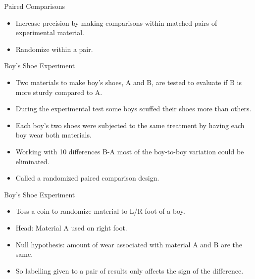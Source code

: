 \documentclass[9pt,ignorenonframetext,]{beamer}
\begin{document}
\begin{frame}{Paired Comparisons}

\begin{itemize}
\item
  Increase precision by making comparisons within matched pairs of
  experimental material.
\item
  Randomize within a pair.
\end{itemize}

\end{frame}

\begin{frame}{Boy's Shoe Experiment}

\begin{itemize}
\item
  Two materials to make boy's shoes, A and B, are tested to evaluate if
  B is more sturdy compared to A.
\item
  During the experimental test some boys scuffed their shoes more than
  others.
\item
  Each boy's two shoes were subjected to the same treatment by having
  each boy wear both materials.
\item
  Working with 10 differences B-A most of the boy-to-boy variation could
  be eliminated.
\item
  Called a randomized paired comparison design.
\end{itemize}

\end{frame}

\begin{frame}{Boy's Shoe Experiment}

\begin{itemize}
\item
  Toss a coin to randomize material to L/R foot of a boy.
\item
  Head: Material A used on right foot.
\item
  Null hypothesis: amount of wear associated with material A and B are
  the same.
\item
  So labelling given to a pair of results only affects the sign of the
  difference.
\end{itemize}

\end{frame}
\end{document}
